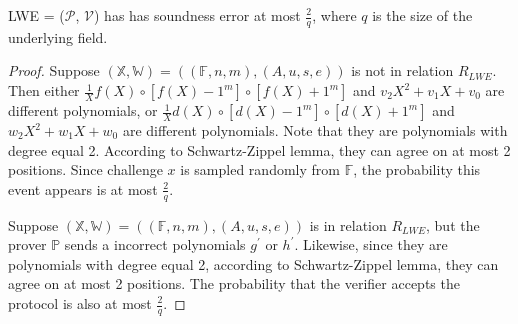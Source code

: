 \begin{lemma}
\label{lemma:lwese}

LWE = ($\mathcal{P}$, $\mathcal{V}$) has has soundness error at most $\frac{2}{q}$, where $q$ is the size of the underlying field.

\end{lemma}
\begin{proof}

Suppose $(\mathbb{X}, \mathbb{W}) = ((\mathbb{F}, n, m), (A, u, s, e))$ is not in relation $R_{LWE}$. Then either $\frac{1}{X} f(X) \circ [f(X) - 1^m] \circ [f(X) + 1^m]$ and $v_2X^2 + v_1X + v_0$ are different polynomials, or $\frac{1}{X} d(X) \circ [d(X) - 1^m] \circ [d(X) + 1^m]$ and $w_2X^2 + w_1X + w_0$ are different polynomials. Note that they are polynomials with degree equal 2. According to Schwartz-Zippel lemma, they can agree on at most 2 positions. Since challenge $x$ is sampled randomly from $\mathbb{F}$, the probability this event appears is at most $\frac{2}{q}$.

Suppose $(\mathbb{X}, \mathbb{W}) = ((\mathbb{F}, n, m), (A, u, s, e))$ is in relation $R_{LWE}$, but the prover $\mathbb{P}$ sends a incorrect polynomials $g^\prime$ or $h^\prime$. Likewise, since they are polynomials with degree equal 2, according to Schwartz-Zippel lemma, they can agree on at most 2 positions. The probability that the verifier accepts the protocol is also at most $\frac{2}{q}$.


\end{proof}

